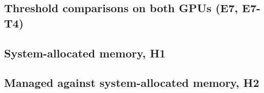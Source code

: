 \documentclass[journal]{IEEEtran}
\begin{document}
\subsection{Threshold comparisons on both GPUs (E7, E7-T4)}

\begin{table}[t]
\centering\footnotesize
\caption{Stock driver, thresholds 0, 10 and 25 against the shipped 51, on the RTX 5070 Ti (E7: Family A, 2 tests; Family B, 16 tests) and the Tesla T4 (E7-\allowbreak{}T4: Family A, 2 tests; Family B, 14 tests); every comparison of both platforms, analysed separately. delta is (arm -\allowbreak{} t51) /\allowbreak{} t51; two-\allowbreak{}sided Mann-\allowbreak{}Whitney U, n =\allowbreak{} 10 per cell; Holm p is adjusted within the family; MDE at the family alpha. Supports Section VII-\allowbreak{}A (threshold on dense workloads, both GPUs, with p-\allowbreak{}values).}
\label{tab:s-t_e7_full}
\end{table}

\subsection{System-allocated memory, H1}

\begin{table}[t]
\centering\footnotesize
\caption{H1 Amendment 1, system-\allowbreak{}allocated (HMM, malloc) memory, in memory, RTX 5070 Ti: threshold 0 against 51 on Stencil-\allowbreak{}24K and the sparse benchmark at K =\allowbreak{} 512 and K =\allowbreak{} 1. Two-\allowbreak{}sided Mann-\allowbreak{}Whitney U, one Holm family of 3, n =\allowbreak{} 10 per cell; MDE at the family alpha. Supports Section VII-\allowbreak{}C (system-\allowbreak{}allocated memory, H1).}
\label{tab:s-t_h1}
\end{table}

\subsection{Managed against system-allocated memory, H2}

\begin{table}[t]
\centering\footnotesize
\caption{H2, sparse benchmark, 8 GiB in memory, managed against system-\allowbreak{}allocated (HMM) memory: threshold 0 against 51 for K =\allowbreak{} 1, 8, 64 and 512. Two-\allowbreak{}sided Mann-\allowbreak{}Whitney U, one Holm family of 8, n =\allowbreak{} 10 per cell; MDE at the family alpha; Cohen's d of the two cells. Supports Section VII-\allowbreak{}C (managed against system-\allowbreak{}allocated memory, H2).}
\label{tab:s-t_h2}
\end{table}
\end{document}
